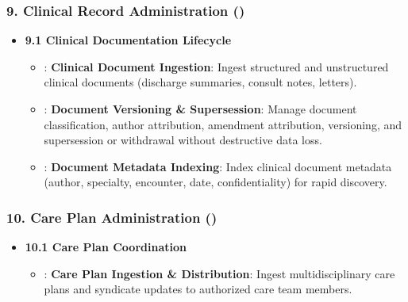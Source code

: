\subsubsection*{9. Clinical Record Administration (\texttt{})}
\label{rad:enabling:328}

\begin{itemize}

\item 
\textbf{9.1 Clinical Documentation Lifecycle}


\begin{itemize}

\item 
\texttt{}: \textbf{Clinical Document Ingestion}: Ingest structured and unstructured clinical documents (discharge summaries, consult notes, letters).



\item 
\texttt{}: \textbf{Document Versioning \& Supersession}: Manage document classification, author attribution, amendment attribution, versioning, and supersession or withdrawal without destructive data loss.



\item 
\texttt{}: \textbf{Document Metadata Indexing}: Index clinical document metadata (author, specialty, encounter, date, confidentiality) for rapid discovery.



\end{itemize}


\end{itemize}
\label{rad:enabling:333}
\subsubsection*{10. Care Plan Administration (\texttt{})}
\label{rad:enabling:334}

\begin{itemize}

\item 
\textbf{10.1 Care Plan Coordination}


\begin{itemize}

\item 
\texttt{}: \textbf{Care Plan Ingestion \& Distribution}: Ingest multidisciplinary care plans and syndicate updates to authorized care team members.



\end{itemize}


\end{itemize}
\label{rad:enabling:337}
